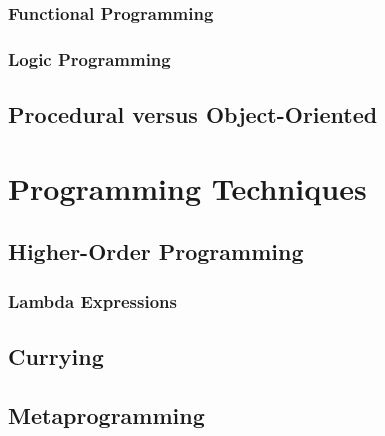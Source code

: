 \subsubsection{Functional Programming}

\subsubsection{Logic Programming}

\subsection{Procedural versus Object-Oriented}

\section{Programming Techniques}

\subsection{Higher-Order Programming}

\subsubsection{Lambda Expressions}

\subsection{Currying}

\subsection{Metaprogramming}

